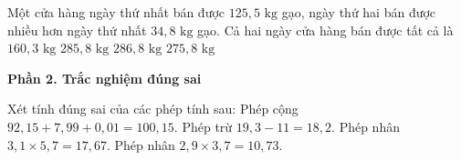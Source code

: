 \begin{ex} %
Một cửa hàng ngày thứ nhất bán được $125{,}5\text{ kg}$ gạo, ngày thứ hai bán được nhiều hơn ngày thứ nhất $34{,}8\text{ kg}$ gạo. Cả hai ngày cửa hàng bán được tất cả là
\choice
{$160{,}3\text{ kg}$}
{\True $285{,}8\text{ kg}$}
{$286{,}8\text{ kg}$}
{$275{,}8\text{ kg}$}
\end{ex}

\textbf{Phần 2. Trắc nghiệm đúng sai}

\begin{ex} %
Xét tính đúng sai của các phép tính sau:
\choiceTF
{\True Phép cộng $92{,}15 + 7{,}99 + 0{,}01 = 100{,}15$.}
{Phép trừ $19{,}3 - 11 = 18{,}2$.}
{\True Phép nhân $3{,}1 \times 5{,}7 = 17{,}67$.}
{\True Phép nhân $2{,}9 \times 3{,}7 = 10{,}73$.}
\end{ex}

